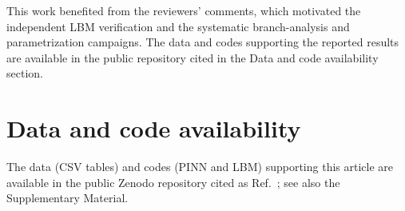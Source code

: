 \documentclass[aip,pof,reprint,superscriptaddress]{revtex4-2}
\begin{document}
\begin{acknowledgments}
This work benefited from the reviewers' comments, which motivated the independent LBM verification and the systematic branch-analysis and parametrization campaigns. The data and codes supporting the reported results are available in the public repository cited in the Data and code availability section.
\end{acknowledgments}

\section*{Data and code availability}
The data (CSV tables) and codes (PINN and LBM) supporting this article are available in the public Zenodo repository cited as Ref.~; see also the Supplementary Material.
\end{document}

